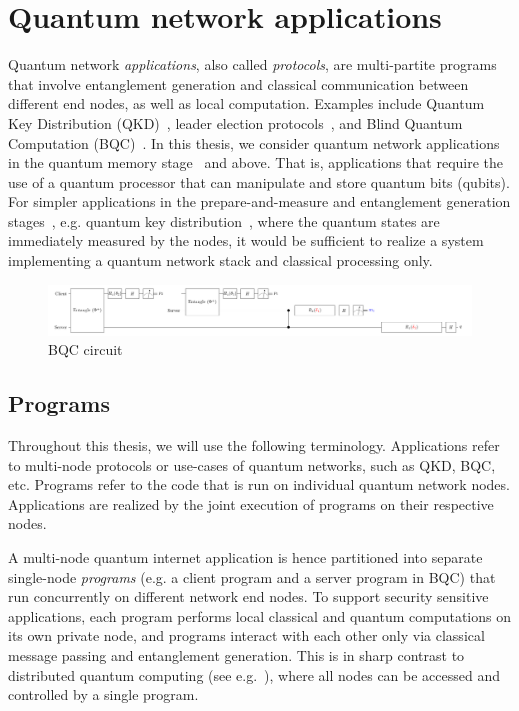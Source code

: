 \section{Quantum network applications}
Quantum network \textit{applications}, also called \textit{protocols}, are multi-partite programs that involve entanglement generation and classical communication between different end nodes, as well as local computation.
Examples include Quantum Key Distribution (QKD)~\cite{bb84, ekert1991quantum}, leader election protocols~\cite{kobayashi2014simpler, ganz2009quantum}, and Blind Quantum Computation (BQC)~\cite{Wehner2018stages}.
In this thesis, we consider quantum network applications in the quantum memory stage~\cite{wehner_2018_stages} and above. That is, applications that require the use of a quantum processor that can manipulate and store quantum bits (qubits). For simpler applications in the prepare-and-measure and entanglement generation stages~\cite{wehner_2018_stages}, e.g. quantum key distribution~\cite{bb84Original,ekert_1991_e91}, where the quantum states are immediately measured by the nodes, it would be sufficient to realize a system implementing a quantum network stack and classical processing only.

\begin{figure}[t]
    \centering
    \includegraphics[width=0.8\linewidth]{figures/background/bqc_circuit.pdf}
    \caption{
      BQC circuit 
    }
    \label{fig:example_circuit}
\end{figure}

\subsection{Programs}
Throughout this thesis, we will use the following terminology.
Applications refer to multi-node protocols or use-cases of quantum networks, such as QKD, BQC, etc.
Programs refer to the code that is run on individual quantum network nodes.
Applications are realized by the joint execution of programs on their respective nodes.

A multi-node quantum internet application is hence partitioned into separate single-node \textit{programs} (e.g. a client program and a server program in BQC) that run concurrently on different network end nodes.
To support security sensitive applications, each program performs local classical and quantum computations on its own private node, and programs interact with each other only via classical message passing and entanglement generation.
This is in sharp contrast to distributed quantum computing (see e.g.~\cite{cacciapuoti2019quantum}), where all nodes can be accessed and controlled by a single program. 


